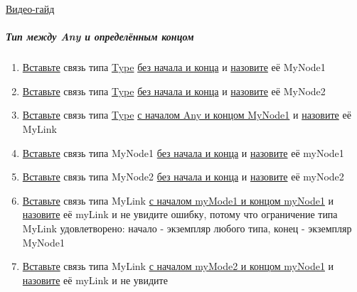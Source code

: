 \href{https://youtu.be/qKmDteKn3g8}{Видео-гайд}
\subparagraph{Тип между Any и определённым концом}
\begin{enumerate}
      \item \hyperlink{DeepCase.InsertLink.Description}{Вставьте} связь типа
            \hyperlink{Core.Type.Description}{Type}
            \hyperlink{FAQ.HowToInsertLinkWithoutFromAndTo}{без
                  начала и конца} и \hyperlink{FAQ.HowToSetName}{назовите} её
            MyNode1
      \item \hyperlink{DeepCase.InsertLink.Description}{Вставьте} связь типа
            \hyperlink{Core.Type.Description}{Type}
            \hyperlink{FAQ.HowToInsertLinkWithoutFromAndTo}{без
                  начала и конца} и \hyperlink{FAQ.HowToSetName}{назовите} её
            MyNode2
      \item \hyperlink{DeepCase.InsertLink.Description}{Вставьте} связь типа
            \hyperlink{Core.Type.Description}{Type}
            \hyperlink{FAQ.HowToInsertLinkWithFromAndTo}{с
                  началом Any и концом MyNode1} и
            \hyperlink{FAQ.HowToSetName}{назовите} её
            MyLink
      \item \hyperlink{DeepCase.InsertLink.Description}{Вставьте} связь типа
            MyNode1
            \hyperlink{FAQ.HowToInsertLinkWithoutFromAndTo}{без начала и конца}
            и
            \hyperlink{FAQ.HowToSetName}{назовите} её myNode1
      \item \hyperlink{DeepCase.InsertLink.Description}{Вставьте} связь типа
            MyNode2
            \hyperlink{FAQ.HowToInsertLinkWithoutFromAndTo}{без начала и конца}
            и
            \hyperlink{FAQ.HowToSetName}{назовите} её myNode2
      \item \hyperlink{DeepCase.InsertLink.Description}{Вставьте} связь типа
            MyLink
            \hyperlink{FAQ.HowToInsertLinkWithFromAndTo}{с началом myMode1 и
                  концом
                  myNode1} и \hyperlink{FAQ.HowToSetName}{назовите} её myLink и
            не
            увидите
            ошибку, потому что ограничение типа MyLink удовлетворено: начало -
            экземпляр
            любого типа, конец - экземпляр MyNode1
      \item \hyperlink{DeepCase.InsertLink.Description}{Вставьте} связь типа
            MyLink
            \hyperlink{FAQ.HowToInsertLinkWithFromAndTo}{с началом myMode2 и
                  концом
                  myNode1} и \hyperlink{FAQ.HowToSetName}{назовите} её myLink и
            не
            увидите

\end{enumerate}
